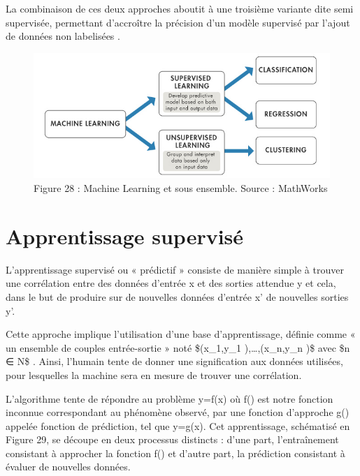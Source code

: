 La combinaison de ces deux approches aboutit à une troisième variante dite semi supervisée, permettant d’accroître la précision d’un modèle supervisé par l’ajout de données non labelisées \cite{Murphy2012}.
 
 \begin{figure}[H]
    \centering
    \includegraphics[width=\linewidth]{contents/chapter_3/resources/MachineLearning.png}
    \caption{Figure 28 : Machine Learning et sous ensemble. Source : MathWorks}
    \label{fig:chapter_3:machine_learning}
\end{figure}


\section*{Apprentissage supervisé}
L’apprentissage supervisé ou « prédictif » consiste de manière simple à trouver une corrélation entre des données d’entrée x et des sorties attendue y et cela, dans le but de produire sur de nouvelles données d’entrée x' de nouvelles sorties y'.\par
Cette approche implique l’utilisation d’une base d’apprentissage, définie comme « un ensemble de couples entrée-sortie » noté \${(x_1,y_1 ),…,(x_n,y_n )}\$ avec \$n ∈ N\$  . Ainsi, l’humain tente de donner une signification aux données utilisées, pour lesquelles la machine sera en mesure de trouver une corrélation.\par
L’algorithme tente de répondre au problème y=f(x) où f() est notre fonction inconnue correspondant au phénomène observé, par une fonction d’approche g() appelée fonction de prédiction, tel que y=g(x).
Cet apprentissage, schématisé en Figure 29, se découpe en deux processus distincts : d’une part, l’entraînement consistant à approcher la fonction f() et d’autre part, la prédiction consistant à évaluer de nouvelles données.\par
  
